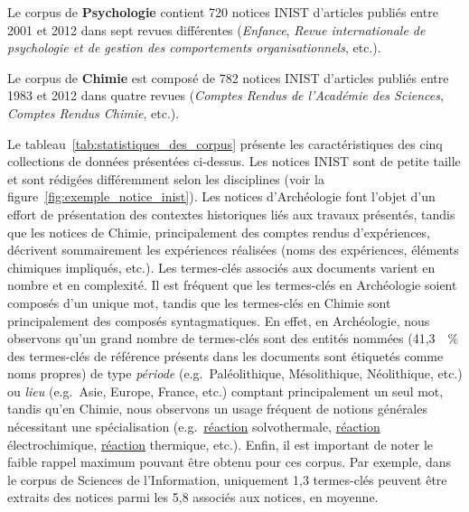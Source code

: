   Le corpus de \textbf{Psychologie} contient 720 notices INIST d'articles
  publiés entre 2001 et 2012 dans sept revues différentes
  (\textit{Enfance}, \textit{Revue internationale de psychologie et de gestion
  des comportements organisationnels}, etc.).

  Le corpus de \textbf{Chimie} est composé de 782 notices INIST d'articles
  publiés entre 1983 et 2012 dans quatre revues (\textit{Comptes Rendus de
  l'Académie des Sciences}, \textit{Comptes Rendus Chimie}, etc.).

  Le tableau~\ref{tab:statistiques_des_corpus} présente les caractéristiques des
  cinq collections de données présentées ci-dessus.
  Les notices INIST sont de petite taille et sont rédigées différemment selon
  les disciplines (voir la figure~\ref{fig:exemple_notice_inist}). Les notices
  d'Archéologie font l'objet d'un effort de présentation des contextes
  historiques liés aux travaux présentés, tandis que les notices de Chimie,
  principalement des comptes rendus d'expériences, décrivent sommairement les
  expériences réalisées (noms des expériences, éléments chimiques impliqués,
  etc.). Les termes-clés associés aux documents varient en nombre et en
  complexité. Il est fréquent que les termes-clés en Archéologie soient composés
  d'un unique mot, tandis que les termes-clés en Chimie sont principalement des
  composés syntagmatiques. En effet, en Archéologie, nous observons qu'un grand
  nombre de termes-clés sont des entités nommées (41,3~~\% des termes-clés de
  référence présents dans les documents sont étiquetés comme noms propres) de
  type \textit{période} (e.g.~\og{}Paléolithique\fg{}, \og{}Mésolithique\fg{},
  \og{}Néolithique\fg{}, etc.) ou \textit{lieu} (e.g.~\og{}Asie\fg{},
  \og{}Europe\fg{}, \og{}France\fg{}, etc.) comptant principalement un seul mot,
  tandis qu'en Chimie, nous observons un usage fréquent de notions générales
  nécessitant une spécialisation (e.g.~\og{}\underline{réaction}
  solvothermale\fg{}, \og{}\underline{réaction} électrochimique\fg{},
  \og{}\underline{réaction} thermique\fg{}, etc.). Enfin, il est important de
  noter le faible rappel maximum pouvant être obtenu pour ces corpus. Par
  exemple, dans le corpus de Sciences de l'Information, uniquement 1,3
  termes-clés peuvent être extraits des notices parmi les 5,8 associés aux
  notices, en moyenne.
